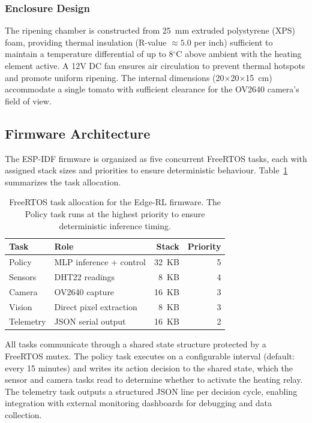     \subsubsection{Enclosure Design}

    The ripening chamber is constructed from 25~mm extruded polystyrene (XPS) foam, providing thermal insulation (R-value $\approx 5.0$ per inch) sufficient to maintain a temperature differential of up to 8$^{\circ}$C above ambient with the heating element active. A 12V DC fan ensures air circulation to prevent thermal hotspots and promote uniform ripening. The internal dimensions (20$\times$20$\times$15~cm) accommodate a single tomato with sufficient clearance for the OV2640 camera's field of view.

    \subsection{Firmware Architecture}
        \label{subsec:Firmware}

    The ESP-IDF firmware is organized as five concurrent FreeRTOS tasks, each with assigned stack sizes and priorities to ensure deterministic behaviour. Table~\ref{tab:freertos_tasks} summarizes the task allocation.

    \begin{table}[ht]
        \caption{FreeRTOS task allocation for the Edge-RL firmware. The Policy task runs at the highest priority to ensure deterministic inference timing.}
        \label{tab:freertos_tasks}
        \centering
        \begin{tabular}{llrr}
            \hline
            \textbf{Task} & \textbf{Role} & \textbf{Stack} & \textbf{Priority} \\
            \hline
            Policy & MLP inference + control & 32~KB & 5 \\
            Sensors & DHT22 readings & 8~KB & 4 \\
            Camera & OV2640 capture & 16~KB & 3 \\
            Vision & Direct pixel extraction & 8~KB & 3 \\
            Telemetry & JSON serial output & 16~KB & 2 \\
            \hline
        \end{tabular}
    \end{table}

    All tasks communicate through a shared state structure protected by a FreeRTOS mutex. The policy task executes on a configurable interval (default: every 15 minutes) and writes its action decision to the shared state, which the sensor and camera tasks read to determine whether to activate the heating relay. The telemetry task outputs a structured JSON line per decision cycle, enabling integration with external monitoring dashboards for debugging and data collection.

